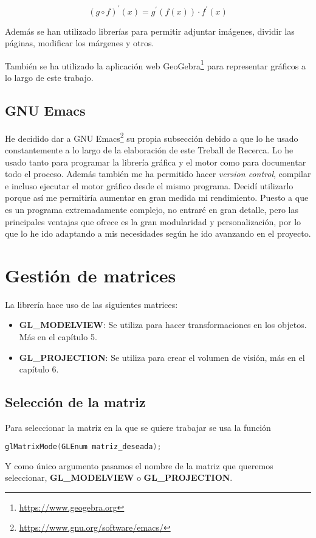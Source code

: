 \begin{equation*}
  (g \circ f)^\prime (x) = g^\prime (f(x))\cdot f^\prime(x)
\end{equation*}

Además se han utilizado librerías para permitir adjuntar imágenes, dividir las páginas, modificar los márgenes y otros.

También se ha utilizado la aplicación web GeoGebra\footnote{\url{https://www.geogebra.org}} para representar gráficos a lo largo de este trabajo.

\subsection{GNU Emacs}
He decidido dar a GNU Emacs\footnote{\url{https://www.gnu.org/software/emacs/}} su propia subsección debido a que lo he usado constantemente a lo largo de la elaboración de este Treball de Recerca. Lo he usado tanto para programar la librería gráfica y el motor como para documentar todo el proceso. Además también me ha permitido hacer \textit{version control}, compilar e incluso ejecutar el motor gráfico desde el mismo programa. Decidí utilizarlo porque así me permitiría aumentar en gran medida mi rendimiento. Puesto a que es un programa extremadamente complejo, no entraré en gran detalle, pero las principales ventajas que ofrece es la gran modularidad y personalización, por lo que lo he ido adaptando a mis necesidades según he ido avanzando en el proyecto.
\newpage
\section{Gestión de matrices}
La librería hace uso de las siguientes matrices:
\begin{itemize}
\item{\textbf{GL\_MODELVIEW}: Se utiliza para hacer transformaciones en los objetos. Más en el capítulo 5.}
\item{\textbf{GL\_PROJECTION}: Se utiliza para crear el volumen de visión, más en el capítulo 6.}
\end{itemize}
\subsection{Selección de la matriz}
Para seleccionar la matriz en la que se quiere trabajar se usa la función
\begin{lstlisting}[language=C]
  glMatrixMode(GLEnum matriz_deseada);
\end{lstlisting}
Y como único argumento pasamos el nombre de la matriz que queremos seleccionar, \textbf{GL\_MODELVIEW} o \textbf{GL\_PROJECTION}.

